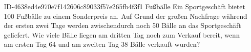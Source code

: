 \begin{exercise}
      {ID-4638ed4e970e7f142606c89033f57e265fb4f3f1}
      {Fußbälle}
  \ifproblem\problem
    Ein Sportgeschäft bietet 100 Fußbälle zu einem Sonderpreis an. Auf Grund der
    großen Nachfrage während der ersten zwei Tage werden zwischendurch noch 50
    Bälle an das Sportgeschäft geliefert. Wie viele Bälle liegen am dritten
    Tag noch zum Verkauf bereit, wenn am ersten Tag 64 und am zweiten Tag 38
    Bälle verkauft wurden?
  \fi
\end{exercise}
